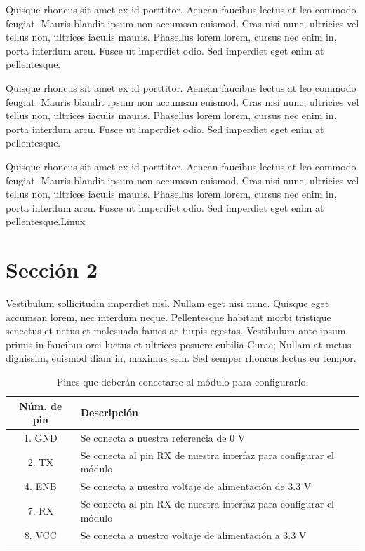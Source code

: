 	Quisque rhoncus sit amet ex id porttitor. Aenean faucibus lectus at leo commodo feugiat. Mauris blandit ipsum non accumsan euismod. Cras nisi nunc, ultricies vel tellus non, ultrices iaculis mauris. Phasellus lorem lorem, cursus nec enim in, porta interdum arcu. Fusce ut imperdiet odio. Sed imperdiet eget enim at pellentesque.
	
	Quisque rhoncus sit amet ex id porttitor. Aenean faucibus lectus at leo commodo feugiat. Mauris blandit ipsum non accumsan euismod. Cras nisi nunc, ultricies vel tellus non, ultrices iaculis mauris. Phasellus lorem lorem, cursus nec enim in, porta interdum arcu. Fusce ut imperdiet odio. Sed imperdiet eget enim at pellentesque.\cite{IEEEreferencias:Ref1} 
	
	Quisque rhoncus sit amet ex id porttitor. Aenean faucibus lectus at leo commodo feugiat. Mauris blandit ipsum non accumsan euismod. Cras nisi nunc, ultricies vel tellus non, ultrices iaculis mauris. Phasellus lorem lorem, cursus nec enim in, porta interdum arcu. Fusce ut imperdiet odio. Sed imperdiet eget enim at pellentesque.\gls{Linux}
	
	
	
	\section{Sección 2}
	
	Vestibulum sollicitudin imperdiet nisl. Nullam eget nisi nunc. Quisque eget accumsan lorem, nec interdum neque. Pellentesque habitant morbi tristique senectus et netus et malesuada fames ac turpis egestas. Vestibulum ante ipsum primis in faucibus orci luctus et ultrices posuere cubilia Curae; Nullam at metus dignissim, euismod diam in, maximus sem. Sed semper rhoncus lectus eu tempor.
	
	\begin{table}[H]			
		\begin{tabularx}{\textwidth}{|c|X|}
			\hline 
			\textbf{Núm. de pin} & \textbf{Descripción} \\ \hline 
			1. GND & Se conecta a nuestra referencia de 0 \si{\volt} \\ \hline 
			2. TX & Se conecta al pin RX de nuestra interfaz para configurar el módulo \\ \hline 
			4. ENB & Se conecta a nuestro voltaje de alimentación de 3.3 \si{\volt} \\ \hline 
			7. RX & Se conecta al pin RX de nuestra interfaz para configurar el módulo \\ \hline 
			8. VCC & Se conecta a nuestro voltaje de alimentación a 3.3 \si{\volt}  \\ \hline 
		\end{tabularx} 
		\caption{\label{tab:pines-conexion} Pines que deberán conectarse al módulo para configurarlo.}
		\end{table}
	
